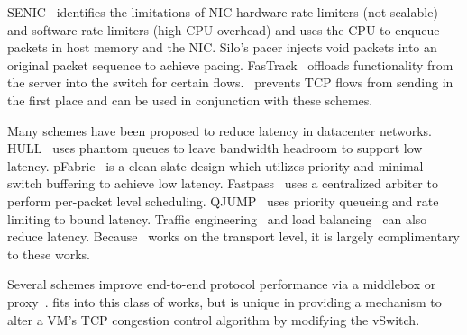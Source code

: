 SENIC~\cite{niranjan2013fastrak} 
identifies the limitations of NIC hardware rate limiters (\ie{}not scalable) and 
software rate limiters (\ie{}high CPU overhead) and uses the CPU to enqueue packets 
in host memory and the NIC. Silo's pacer injects void packets into 
an original packet sequence to achieve pacing. FasTrack~\cite{niranjan2013fastrak} offloads
functionality from the server into the switch for certain flows.~\acdc{} prevents
TCP flows from sending in the first place and can be used in conjunction with these
schemes.


Many schemes have been proposed to reduce latency in datacenter networks.
HULL~\cite{alizadeh2012less} uses phantom queues to leave bandwidth headroom to support low latency.
pFabric~\cite{alizadeh2013pfabric} is a clean-slate
design which utilizes priority and minimal switch buffering to achieve low latency.
Fastpass~\cite{perry2014fastpass} uses a centralized arbiter to
perform per-packet level scheduling.
QJUMP~\cite{qjump} uses priority queueing and rate limiting to
bound latency. Traffic engineering~\cite{hedera,rasley2014planck} and 
load balancing~\cite{conga,he2015presto,ghorbani2015micro} can also
reduce latency. Because~\acdc{} works on the transport level, it is
largely complimentary to these works.

Several schemes improve end-to-end protocol performance via a middlebox
or proxy~\cite{RFC3449,RFC3115,balakrishnan2008maelstrom,davern2011httpep,balakrishnan1995improving}.
\acdc{} fits into this class of works, but is unique in providing a mechanism
to alter a VM's TCP congestion control algorithm by modifying the vSwitch.


